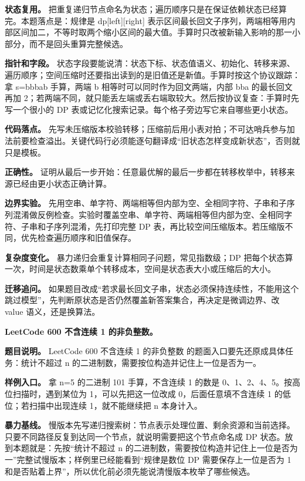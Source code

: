 \textbf{状态复用。} 把重复递归节点命名为状态；遍历顺序只是在保证依赖状态已经算完。本题落点是：规律是 dp[left][right] 表示区间最长回文子序列，两端相等用内部区间加二，不等时取两个缩小区间的最大值。手算时只改被新输入影响的那一小部分，而不是回头重算完整候选。

\textbf{指针和字段。} 状态字段要能说清：状态下标、状态值语义、初始化、转移来源、遍历顺序；空间压缩时还要指出读到的是旧值还是新值。手算时按这个协议跟踪：拿 s=bbbab 手算，两端 b 相等时可以同时作为回文两端，内部 bba 的最长回文再加 2；若两端不同，就只能丢左端或丢右端取较大。然后按协议复查：手算时先写一个很小的 DP 表或记忆化搜索记录。每个格子旁边写它来自哪些更小状态。

\textbf{代码落点。} 先写未压缩版本校验转移；压缩前后用小表对拍；不可达哨兵参与加法前要检查溢出。关键代码行必须能逐句翻译成“旧状态怎样变成新状态”，否则就只是模板。

\textbf{正确性。} 证明从最后一步开始：任意最优解的最后一步都在转移枚举中，转移来源已经由更小状态正确计算。

\textbf{边界实验。} 先用空串、单字符、两端相等但内部为空、全相同字符、子串和子序列混淆做反例检查。实验时覆盖空串、单字符、两端相等但内部为空、全相同字符、子串和子序列混淆，先打印完整 DP 表，再比较空间压缩版本。若压缩版不同，优先检查遍历顺序和旧值保存。

\textbf{复杂度变化。} 暴力递归会重复计算相同子问题，常见指数级；DP 把每个状态算一次，时间是状态数乘单个转移成本，空间是状态表大小或压缩后的大小。

\textbf{迁移追问。} 如果题目改成“若求最长回文子串，状态必须保持连续性，不能用这个跳过模型”，先判断原状态是否仍然覆盖新答案集合，再决定是微调边界、改 value 语义，还是换算法。

\noindent\textbf{LeetCode 600 不含连续 1 的非负整数。}

\textbf{题目说明。} LeetCode 600 不含连续 1 的非负整数 的题面入口要先还原成具体任务：统计不超过 n 的二进制数，需要按位构造并记住上一位是否为一。

\textbf{样例入口。} 拿 n=5 的二进制 101 手算，不含连续 1 的数是 0、1、2、4、5。按高位扫描时，遇到某位为 1，可以先把这一位改成 0，后面任意填不含连续 1 的低位；若扫描中出现连续 1，就不能继续把 n 本身计入。

\textbf{暴力基线。} 慢版本先写递归搜索树：节点表示处理位置、剩余资源和当前选择。只要不同路径反复到达同一个节点，就说明需要把这个节点命名成 DP 状态。放到本题就是：先按“统计不超过 n 的二进制数，需要按位构造并记住上一位是否为一”完整试慢版本；样例里已经能看到“规律是数位 DP 需要保存上一位是否为 1 和是否贴着上界”，所以优化前必须先能说清慢版本枚举了哪些候选。

